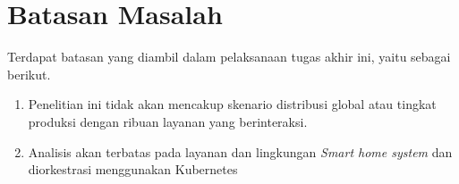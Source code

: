 \section{Batasan Masalah}
\label{sec:batasan-masalah}

Terdapat batasan yang diambil dalam pelaksanaan tugas akhir ini, yaitu sebagai berikut.

\begin{enumerate}
  \item Penelitian ini tidak akan mencakup skenario distribusi global atau tingkat produksi dengan ribuan layanan yang berinteraksi.
  \item Analisis akan terbatas pada layanan dan lingkungan
        \textit{Smart home system}  dan diorkestrasi menggunakan Kubernetes
\end{enumerate}

